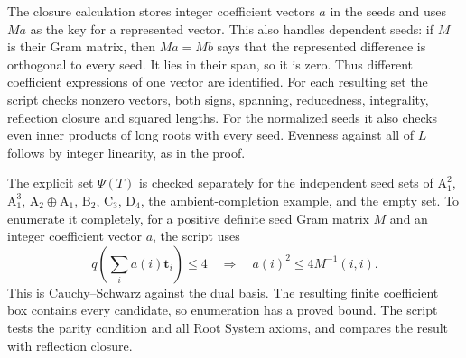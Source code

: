 \documentclass[11pt]{amsart}
\theoremstyle{definition}
\newcommand{\typ}[1]{\mathrm{#1}}
\newcommand{\Zt}{{\mathbf t}}
\begin{document}
The closure calculation stores integer coefficient vectors $a$ in the
seeds and uses $Ma$ as the key for a represented vector. This also
handles dependent seeds: if $M$ is their Gram matrix, then
$Ma=Mb$ says that the represented difference is orthogonal to every
seed. It lies in their span, so it is zero. Thus different coefficient
expressions of one vector are identified. For each resulting set the
script checks nonzero vectors, both signs, spanning, reducedness,
integrality, reflection closure and squared lengths. For the normalized
seeds it also checks even inner products of long roots with every seed.
Evenness against all of $L$ follows by integer linearity, as in the proof.

The explicit set $\Psi(T)$ is checked separately for the independent
seed sets of $\typ A_1^2$, $\typ A_1^3$, $\typ A_2\oplus\typ A_1$,
$\typ B_2$, $\typ C_3$, $\typ D_4$, the ambient-completion example,
and the empty set. To enumerate it completely, for a positive definite
seed Gram matrix $M$ and an integer coefficient vector $a$, the script
uses
\[
 q\left(\sum_i a(i)\Zt_i\right)\leq4
 \quad\Longrightarrow\quad a(i)^2\leq4M^{-1}(i,i).
\]
This is Cauchy--Schwarz against the dual basis. The resulting finite
coefficient box contains every candidate, so enumeration has a proved
bound. The script tests the parity condition and all Root System axioms,
and compares the result with reflection closure.
\end{document}
